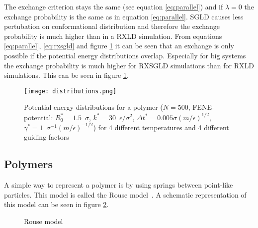 \documentclass[a4paper]{article}
\begin{document}
The exchange criterion stays the same (see equation \ref{eq:parallel}) and if $\lambda = 0$ the exchange probability is the same as in equation \ref{eq:parallel}. SGLD causes less pertubation on conformational distribution and therefore the exchange probability is much higher than in a RXLD simulation. From equations \ref{eq:parallel}, \ref{eq:rxsgld} and figure \ref{im:distributions} it can be seen that an exchange is only possible if the potential energy distributions overlap. Especially for big systems the exchange probability is much higher for RXSGLD simulations than for RXLD simulations. This can be seen in figure \ref{im:distributions}.

\begin{figure} [H]
\centering
\texttt{[image: distributions.png]}
\caption{Potential energy distributions for a polymer ($N = 500$, FENE-potential: $R_0^* = 1.5 \enspace \sigma$, $k^* = 30 \enspace \epsilon/\sigma^2$, $\Delta t^* = 0.005 \sigma (m/\epsilon)^{1/2}$, $\gamma^* = 1 \enspace \sigma^{-1} (m/\epsilon)^{-1/2}$) for 4 different temperatures and 4 different guiding factors}
\label{im:distributions}
\end{figure}

\subsection{Polymers}

A simple way to represent a polymer is by using springs between point-like particles. This model is called the Rouse model~\cite{Rouse1953}. A schematic representation of this model can be seen in figure \ref{im:rouse_model}.

\begin{figure}[H]
\centering
{}
\label{im:rouse_model}
\caption{Rouse model}
\end{figure}
\end{document}
